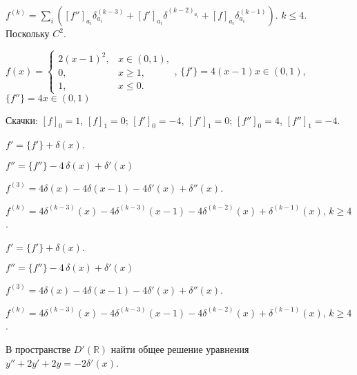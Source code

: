 \begin{sol}
	$f^{(k)}=\sum_i([f'']_{a_i}\delta^{(k-3)}_{a_i}+[f']_{a_i}\delta^{(k-2)_{a_i}}+[f]_{a_i}\delta^{(k-1)}_{a_i})$.
	$k\leq4$.
	Поскольку $C^2$.

	$
		f(x) =
		\begin{cases}
			2(x-1)^2, & x \in (0,1), \\
			0,        & x \ge 1,     \\
			1,        & x \le 0.
		\end{cases}
	$,
	$
		\{f'\}=4(x-1) x \in (0,1)
	$,
	$
		\{f''\}=4 x \in (0,1)
	$

	Скачки:
	$[f]_0=1$, $[f]_1=0$; $[f']_0=-4$, $[f']_1=0$; $[f'']_0=4$, $[f'']_1=-4$.

	$f'=\{f'\}+\delta(x)$.

	$f''=\{f''\}-4\,\delta(x)+\delta'(x)$

	$f^{(3)}=4\delta(x)-4\delta(x-1)-4\delta'(x)+\delta''(x).$

	$f^{(k)}=4\delta^{(k-3)}(x)-4\delta^{(k-3)}(x-1)-4\delta^{(k-2)}(x)+\delta^{(k-1)}(x)$,
	$k\ge4$.


\end{sol}

\begin{out}

	$f'=\{f'\}+\delta(x)$.

	$f''=\{f''\}-4\,\delta(x)+\delta'(x)$

	$f^{(3)}=4\delta(x)-4\delta(x-1)-4\delta'(x)+\delta''(x).$

	$f^{(k)}=4\delta^{(k-3)}(x)-4\delta^{(k-3)}(x-1)-4\delta^{(k-2)}(x)+\delta^{(k-1)}(x)$,
	$k\ge4$.
\end{out}

\newpage
{}
\begin{cond}
	В пространстве \(D'(\mathbb{R})\) найти общее решение уравнения
	$y'' + 2y' + 2y = -2\delta'(x)$.
\end{cond}
